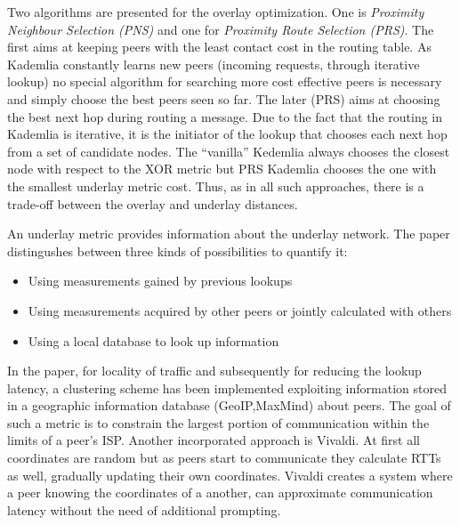 \documentclass[a4paper,10pt]{article}
\begin{document}
Two algorithms are presented for the overlay optimization. One is \emph{Proximity Neighbour Selection (PNS)} and one for \emph{Proximity Route Selection (PRS)}. The first aims at keeping peers with the least contact cost in the routing table. As Kademlia constantly learns new peers (incoming requests, through iterative lookup) no special algorithm for searching more cost effective peers is necessary and simply choose the best peers seen so far. The later (PRS) aims at choosing the best next hop during routing a message. Due to the fact that the routing in Kademlia is iterative, it is the initiator of the lookup that chooses each next hop from a set of candidate nodes. The ``vanilla'' Kedemlia always chooses the closest node with respect to the XOR metric but PRS Kademlia chooses the one with the smallest underlay metric cost. Thus, as in all such approaches, there is a trade-off between the overlay and underlay distances.

An underlay metric provides information about the underlay network. The paper distingushes between three kinds of possibilities to quantify it:
\begin{itemize}
 \item Using measurements gained by previous lookups
 \item Using measurements acquired by other peers or jointly calculated with others
 \item Using a local database to look up information
\end{itemize}
In the paper, for locality of traffic and subsequently for reducing the lookup latency, a clustering scheme has been implemented exploiting information stored in a geographic information database (GeoIP,MaxMind) about peers. The goal of such a metric is to constrain the largest portion of communication within the limits of a peer's ISP.
Another incorporated approach is Vivaldi\cite{cox_vivaldi_2004}. At first all coordinates are random but as peers start to communicate they calculate RTTs as well, gradually updating their own coordinates. Vivaldi creates a system where a peer knowing the coordinates of a another, can approximate communication latency without the need of additional prompting.
\end{document}
